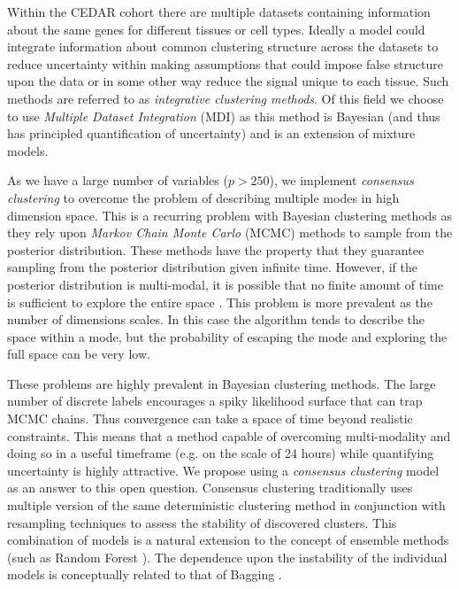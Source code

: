 \documentclass[12pt]{article} %
\begin{document}
	Within the CEDAR cohort there are multiple datasets containing information about the same genes for different tissues or cell types. Ideally a model could integrate information about common clustering structure across the datasets to reduce uncertainty within making assumptions that could impose false structure upon the data or in some other way reduce the signal unique to each tissue. Such methods are referred to as \emph{integrative clustering methods}. Of this field we choose to use \emph{Multiple Dataset Integration} (MDI) \cite{KirkBayesiancorrelatedclustering2012} as this method is Bayesian (and thus has principled quantification of uncertainty) and is an extension of mixture models.
	
	As we have a large number of variables ($p > 250$), we implement \emph{consensus clustering} to overcome the problem of describing multiple modes in high dimension space. This is a recurring problem with Bayesian clustering methods as they rely upon \emph{Markov Chain Monte Carlo} (MCMC) methods to sample from the posterior distribution. These methods have the property that they guarantee sampling from the posterior distribution given infinite time. However, if the posterior distribution is multi-modal, it is possible that no finite amount of time is sufficient to explore the entire space \cite{TjelmelandModeJumpingProposals2001}. This problem is more prevalent as the number of dimensions scales. In this case the algorithm tends to describe the space within a mode, but the probability of escaping the mode and exploring the full space can be very low. 
	
	
	These problems are highly prevalent in Bayesian clustering methods. The large number of discrete labels encourages a spiky likelihood surface that can trap MCMC chains. Thus convergence can take a space of time beyond realistic constraints. This means that a method capable of overcoming multi-modality and doing so in a useful timeframe (e.g. on the scale of 24 hours) while quantifying uncertainty is highly attractive. We propose using a \emph{consensus clustering} \cite{MontiConsensusClusteringResamplingBased} model as an answer to this open question. Consensus clustering traditionally uses multiple version of the same deterministic clustering method in conjunction with resampling techniques to assess the stability of discovered clusters. This combination of models is a natural extension to the concept of ensemble methods (such as Random Forest \cite{BreimanRandomForests1}). The dependence upon the instability of the individual models is conceptually related to that of Bagging \cite{BreimanBaggingpredictors1996}.
	
\end{document}
